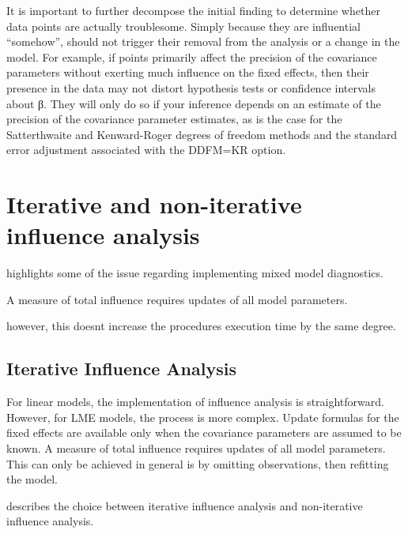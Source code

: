 \documentclass[Main.tex]{subfiles}
\begin{document}
	It is important to further decompose the initial finding to determine whether data points are actually troublesome.
	Simply because they are influential “somehow”, should not trigger their removal from the analysis or
	a change in the model. For example, if points primarily affect the precision of the covariance parameters
	without exerting much influence on the fixed effects, then their presence in the data may not distort hypothesis
	tests or confidence intervals about β. They will only do so if your inference depends on an estimate of the
	precision of the covariance parameter estimates, as is the case for the Satterthwaite and Kenward-Roger
	degrees of freedom methods and the standard error adjustment associated with the DDFM=KR option.
	
	
\newpage




\newpage
\section{Iterative and non-iterative influence analysis} %
\citet{schabenberger} highlights some of the issue regarding implementing mixed model diagnostics.

A measure of total influence requires updates of all model parameters.

however, this doesnt increase the procedures execution time by the same degree.
\subsection{Iterative Influence Analysis}

For linear models, the implementation of influence analysis is straightforward.
However, for LME models, the process is more complex. Update formulas for the fixed effects are available only when the covariance parameters are assumed to be known. A measure of total influence requires updates of all model parameters.
This can only be achieved in general is by omitting observations, then refitting the model.

\citet{schabenberger} describes the choice between  iterative influence analysis and  non-iterative influence analysis.


\end{document}
